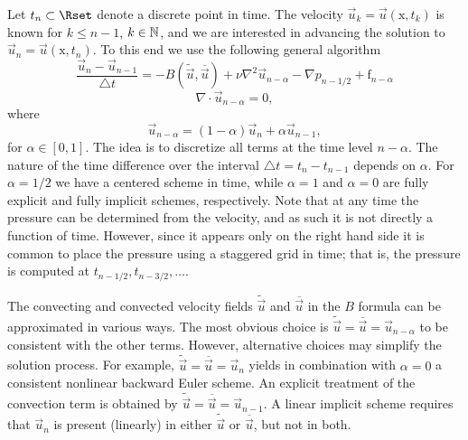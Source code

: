 Let $t_n \subset \Rset$ denote a discrete point in time. The velocity
$\vec{u}_k=\vec{u}(\text{x},t_k)$ is known for $k\leqslant n-1$, $k \in
\mathbb{N}$, and we are interested in advancing the solution to
$\vec{u}_{n}=\vec{u}(\text{x},t_{n})$. To this end we use the
following general algorithm
\begin{equation}
\label{eq:mortensen:NS_d} \frac{\vec{u}_{n}-\vec{u}_{n-1}}{\triangle t} = - B(\tilde{\vec{u}},\overline{\vec{u}}) + \nu \nabla^2 \vec{u}_{n-\alpha} -\nabla p_{n-1/2} + \text{f}_{n-\alpha}
\end{equation}
\begin{equation}
 \label{eq:mortensen:cont_d} \nabla \cdot \vec{u}_{n-\alpha} =0,
\end{equation}
where
\[ \vec{u}_{n-\alpha}=(1-\alpha) \vec{u}_{n} + \alpha \vec{u}_{n-1},\]
for $\alpha \in [0,1]$.  The idea is to discretize all terms at the
time level $n-\alpha$. The nature of the time difference over the
interval $\triangle t = t_{n}-t_{n-1}$ depends on $\alpha$. For
$\alpha =1/2$ we have a centered scheme in time, while $\alpha =1$ and
$\alpha=0$ are fully explicit and fully implicit schemes,
respectively. Note that at any time the pressure can be determined
from the velocity, and as such it is not directly a function of
time. However, since it appears only on the right hand side it is
common to place the pressure using a staggered grid in time; that is, the
pressure is computed at $t_{n-1/2}, t_{n-3/2}, \ldots$.

The convecting and convected velocity fields $\tilde{\vec{u}}$ and
$\overline{\vec{u}}$ in the $B$ formula can be approximated in various
ways. The most obvious choice is
$\tilde{\vec{u}}=\overline{\vec{u}}=\vec{u}_{n-\alpha}$ to be
consistent with the other terms. However, alternative choices may
simplify the solution process. For example,
$\tilde{\vec{u}}=\overline{\vec{u}}=\vec{u}_{n}$ yields in combination
with $\alpha=0$ a consistent nonlinear backward Euler scheme. An
explicit treatment of the convection term is obtained by
$\tilde{\vec{u}} = \overline{\vec{u}} = \vec{u}_{n-1}$.  A linear
implicit scheme requires that $\vec{u}_{n}$ is present (linearly) in
either $\tilde{\vec{u}}$ or $\overline{\vec{u}}$, but not in both.

